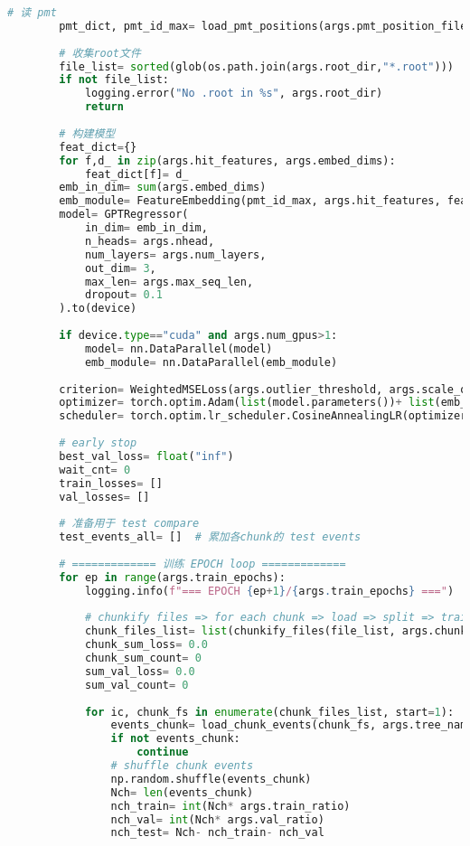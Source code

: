 \begin{lstlisting}[language=Python, caption={模型训练、验证与测试对比脚本 (train\_val\_test\_compare\_v1.py)}, label={lst:train_script}]
        # 读 pmt
        pmt_dict, pmt_id_max= load_pmt_positions(args.pmt_position_file)
    
        # 收集root文件
        file_list= sorted(glob(os.path.join(args.root_dir,"*.root")))
        if not file_list:
            logging.error("No .root in %s", args.root_dir)
            return
    
        # 构建模型
        feat_dict={}
        for f,d_ in zip(args.hit_features, args.embed_dims):
            feat_dict[f]= d_
        emb_in_dim= sum(args.embed_dims)
        emb_module= FeatureEmbedding(pmt_id_max, args.hit_features, feat_dict).to(device)
        model= GPTRegressor(
            in_dim= emb_in_dim,
            n_heads= args.nhead,
            num_layers= args.num_layers,
            out_dim= 3,
            max_len= args.max_seq_len,
            dropout= 0.1
        ).to(device)
    
        if device.type=="cuda" and args.num_gpus>1:
            model= nn.DataParallel(model)
            emb_module= nn.DataParallel(emb_module)
    
        criterion= WeightedMSELoss(args.outlier_threshold, args.scale_outlier)
        optimizer= torch.optim.Adam(list(model.parameters())+ list(emb_module.parameters()), lr=args.lr)
        scheduler= torch.optim.lr_scheduler.CosineAnnealingLR(optimizer, T_max=args.train_epochs, eta_min=args.eta_min)
    
        # early stop
        best_val_loss= float("inf")
        wait_cnt= 0
        train_losses= []
        val_losses= []
    
        # 准备用于 test compare
        test_events_all= []  # 累加各chunk的 test events
    
        # ============= 训练 EPOCH loop =============
        for ep in range(args.train_epochs):
            logging.info(f"=== EPOCH {ep+1}/{args.train_epochs} ===")
    
            # chunkify files => for each chunk => load => split => train
            chunk_files_list= list(chunkify_files(file_list, args.chunk_size))
            chunk_sum_loss= 0.0
            chunk_sum_count= 0
            sum_val_loss= 0.0
            sum_val_count= 0
    
            for ic, chunk_fs in enumerate(chunk_files_list, start=1):
                events_chunk= load_chunk_events(chunk_fs, args.tree_name, pmt_dict, args)
                if not events_chunk:
                    continue
                # shuffle chunk events
                np.random.shuffle(events_chunk)
                Nch= len(events_chunk)
                nch_train= int(Nch* args.train_ratio)
                nch_val= int(Nch* args.val_ratio)
                nch_test= Nch- nch_train- nch_val
    

\end{lstlisting}
